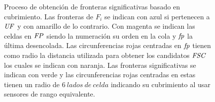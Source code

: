 \begin{figure}[H]

  \captionsetup{justification=justified}
  \caption[Proceso de obtención de fronteras significativas basado en cubrimiento.]{Proceso
    de obtención de fronteras significativas basado en cubrimiento. Las fronteras de $F_i$ se
    indican con azul si pertenecen a $\mathit{UF}$ y con amarillo de lo contrario.
    Con magenta se indican las celdas en $\mathit{FP}$ siendo la numeración su
    orden en la cola y $\mathit{fp}$ la última desencolada. Las
    circunferencias rojas centradas en $\mathit{fp}$ tienen como radio la distancia
    utilizada para obtener los candidatos $\mathit{FSC}$ los cuales se indican con
    naranja. Las fronteras significativas se indican con verde y las circunferencias rojas centradas en estas tienen un radio de $6\
  lados\ de\ celda$ indicando su cubrimiento
    al usar sensores de rango equivalente.}\label{fig:ejemploFSCubComp}

\end{figure}
